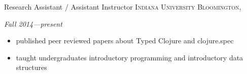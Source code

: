 \documentclass[10pt,a4paper]{article}
\begin{document}


\headedsection
  {{Research Assistant / Assistant Instructor}}
  {\textsc{Indiana University Bloomington, }} {%
    {\textit{Fall 2014---present}}
    {
    \begin{itemize}
      \item published peer reviewed papers about Typed Clojure and clojure.spec
      \item taught undergraduates introductory programming and introductory data structures
    \end{itemize}
    }
}


%
\end{document}
